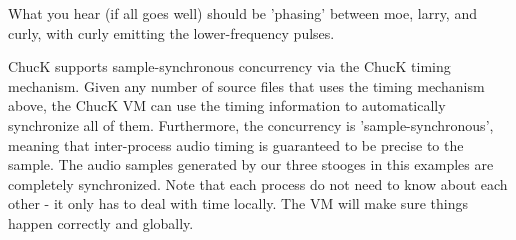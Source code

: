 What you hear (if all goes well) should be 'phasing' between moe, larry, and curly, 
with curly emitting the lower-frequency pulses. 

ChucK supports sample-synchronous concurrency via the ChucK timing mechanism. Given any 
number of source files that uses the timing mechanism above, the ChucK VM can use the timing 
information to automatically synchronize all of them. Furthermore, the concurrency is 
'sample-synchronous', meaning that inter-process audio timing is guaranteed to be precise to 
the sample. The audio samples generated by our three stooges in this examples are completely 
synchronized. Note that each process do not need to know about each other - it only has to deal 
with time locally. The VM will make sure things happen correctly and globally. 

